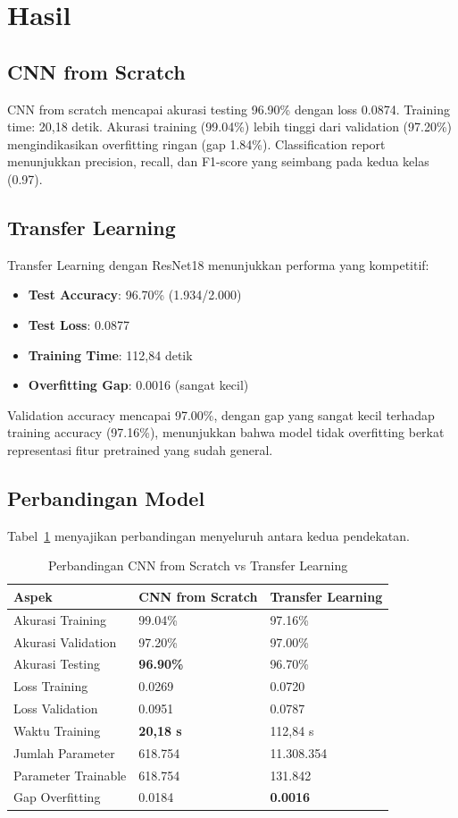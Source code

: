 \documentclass[conference]{IEEEtran}
\begin{document}
\section{Hasil}

\subsection{CNN from Scratch}
CNN from scratch mencapai akurasi testing 96.90\% dengan loss 0.0874. Training time: 20,18 detik. Akurasi training (99.04\%) lebih tinggi dari validation (97.20\%) mengindikasikan overfitting ringan (gap 1.84\%). Classification report menunjukkan precision, recall, dan F1-score yang seimbang pada kedua kelas (0.97).

\subsection{Transfer Learning}
Transfer Learning dengan ResNet18 menunjukkan performa yang kompetitif:
\begin{itemize}
\item \textbf{Test Accuracy}: 96.70\% (1.934/2.000)
\item \textbf{Test Loss}: 0.0877
\item \textbf{Training Time}: 112,84 detik
\item \textbf{Overfitting Gap}: 0.0016 (sangat kecil)
\end{itemize}
Validation accuracy mencapai 97.00\%, dengan gap yang sangat kecil terhadap training accuracy (97.16\%), menunjukkan bahwa model tidak overfitting berkat representasi fitur pretrained yang sudah general.

\subsection{Perbandingan Model}
Tabel~\ref{tab:comparison} menyajikan perbandingan menyeluruh antara kedua pendekatan.

\begin{table}[htbp]
\caption{Perbandingan CNN from Scratch vs Transfer Learning}
\centering
\footnotesize
\begin{tabular}{p{3cm}p{2.8cm}p{3cm}}
\toprule
\textbf{Aspek} & \textbf{CNN from Scratch} & \textbf{Transfer Learning} \\
\midrule
Akurasi Training & 99.04\% & 97.16\% \\
Akurasi Validation & 97.20\% & 97.00\% \\
Akurasi Testing & \textbf{96.90\%} & 96.70\% \\
Loss Training & 0.0269 & 0.0720 \\
Loss Validation & 0.0951 & 0.0787 \\
Waktu Training & \textbf{20,18 s} & 112,84 s \\
Jumlah Parameter & 618.754 & 11.308.354 \\
Parameter Trainable & 618.754 & 131.842 \\
Gap Overfitting & 0.0184 & \textbf{0.0016} \\
\bottomrule
\end{tabular}
\label{tab:comparison}
\end{table}
\end{document}
